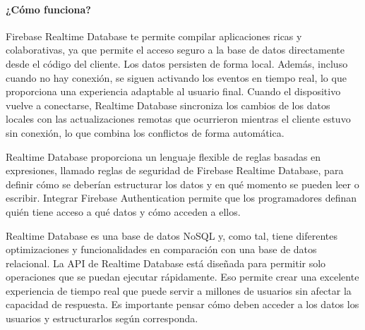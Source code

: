\paragraph{¿Cómo funciona?}

Firebase Realtime Database te permite compilar aplicaciones ricas y colaborativas, ya que permite el acceso seguro a la base de datos directamente desde el código del cliente. Los datos persisten de forma local. Además, incluso cuando no hay conexión, se siguen activando los eventos en tiempo real, lo que proporciona una experiencia adaptable al usuario final. Cuando el dispositivo vuelve a conectarse, Realtime Database sincroniza los cambios de los datos locales con las actualizaciones remotas que ocurrieron mientras el cliente estuvo sin conexión, lo que combina los conflictos de forma automática.

Realtime Database proporciona un lenguaje flexible de reglas basadas en expresiones, llamado reglas de seguridad de Firebase Realtime Database, para definir cómo se deberían estructurar los datos y en qué momento se pueden leer o escribir. Integrar Firebase Authentication permite que los programadores definan quién tiene acceso a qué datos y cómo acceden a ellos.

Realtime Database es una base de datos NoSQL y, como tal, tiene diferentes optimizaciones y funcionalidades en comparación con una base de datos relacional. La API de Realtime Database está diseñada para permitir solo operaciones que se puedan ejecutar rápidamente. Eso permite crear una excelente experiencia de tiempo real que puede servir a millones de usuarios sin afectar la capacidad de respuesta. Es importante pensar cómo deben acceder a los datos los usuarios y estructurarlos según corresponda.